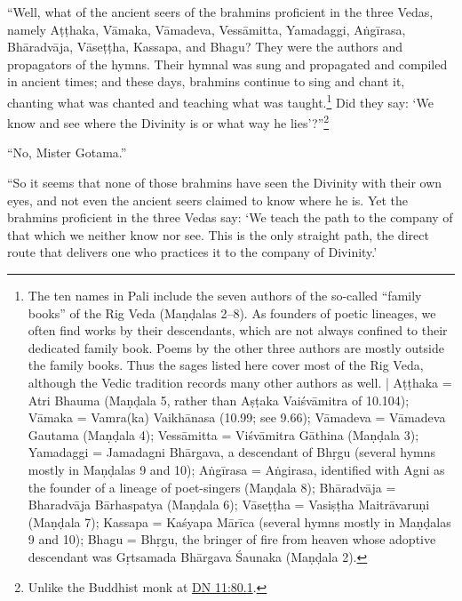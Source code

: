 \documentclass[12pt,openany]{book}%
\begin{document}
“Well, what of the ancient seers of the brahmins proficient in the three Vedas, namely \textsanskrit{Aṭṭhaka}, \textsanskrit{Vāmaka}, \textsanskrit{Vāmadeva}, \textsanskrit{Vessāmitta}, Yamadaggi, \textsanskrit{Aṅgīrasa}, \textsanskrit{Bhāradvāja}, \textsanskrit{Vāseṭṭha}, Kassapa, and Bhagu? They were the authors and propagators of the hymns. Their hymnal was sung and propagated and compiled in ancient times; and these days, brahmins continue to sing and chant it, chanting what was chanted and teaching what was taught.\footnote{The ten names in Pali include the seven authors of the so-called “family books” of the Rig Veda (\textsanskrit{Maṇḍalas} 2–8). As founders of poetic lineages, we often find works by their descendants, which are not always confined to their dedicated family book. Poems by the other three authors are mostly outside the family books. Thus the sages listed here cover most of the Rig Veda, although the Vedic tradition records many other authors as well. | \textsanskrit{Aṭṭhaka} = Atri Bhauma (\textsanskrit{Maṇḍala} 5, rather than \textsanskrit{Aṣṭaka} \textsanskrit{Vaiśvāmitra} of 10.104); \textsanskrit{Vāmaka} = Vamra(ka) \textsanskrit{Vaikhānasa} (10.99; see 9.66); \textsanskrit{Vāmadeva} = \textsanskrit{Vāmadeva} Gautama (\textsanskrit{Maṇḍala} 4); \textsanskrit{Vessāmitta} = \textsanskrit{Viśvāmitra} \textsanskrit{Gāthina} (\textsanskrit{Maṇḍala} 3); Yamadaggi = Jamadagni \textsanskrit{Bhārgava}, a descendant of \textsanskrit{Bhṛgu} (several hymns mostly in \textsanskrit{Maṇḍalas} 9 and 10); \textsanskrit{Aṅgīrasa} = \textsanskrit{Aṅgirasa}, identified with Agni as the founder of a lineage of poet-singers (\textsanskrit{Maṇḍala} 8); \textsanskrit{Bhāradvāja} = \textsanskrit{Bharadvāja} \textsanskrit{Bārhaspatya} (\textsanskrit{Maṇḍala} 6); \textsanskrit{Vāseṭṭha} = \textsanskrit{Vasiṣṭha} \textsanskrit{Maitrāvaruṇi} (\textsanskrit{Maṇḍala} 7); Kassapa = \textsanskrit{Kaśyapa} \textsanskrit{Mārīca} (several hymns mostly in \textsanskrit{Maṇḍalas} 9 and 10); Bhagu = \textsanskrit{Bhṛgu}, the bringer of fire from heaven whose adoptive descendant was \textsanskrit{Gṛtsamada} \textsanskrit{Bhārgava} Śaunaka (\textsanskrit{Maṇḍala} 2). } Did they say: ‘We know and see where the Divinity is or what way he lies’?”\footnote{Unlike the Buddhist monk at \href{https://suttacentral.net/dn11/en/sujato\#80.1}{DN 11:80.1}. } 

“No, Mister Gotama.” 

“So it seems that none of those brahmins have seen the Divinity with their own eyes, and not even the ancient seers claimed to know where he is. Yet the brahmins proficient in the three Vedas say: ‘We teach the path to the company of that which we neither know nor see. This is the only straight path, the direct route that delivers one who practices it to the company of Divinity.’ 
\end{document}
